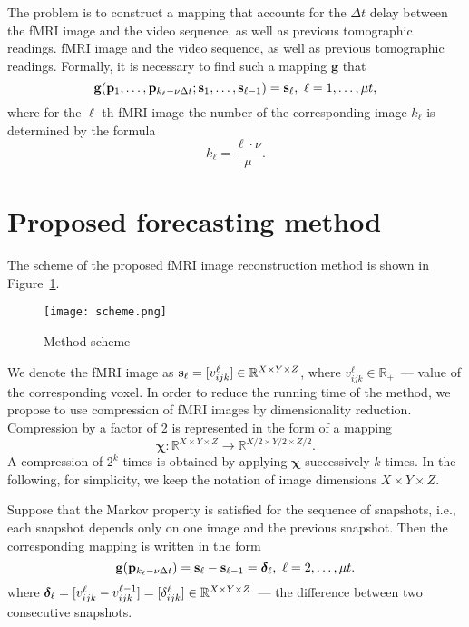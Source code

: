 \documentclass{article}
\begin{document}
The problem is to construct a mapping that accounts for the $\Delta t$ delay between the fMRI image and the video sequence, as well as previous tomographic readings.
fMRI image and the video sequence, as well as previous tomographic readings. Formally, it is necessary to
find such a mapping $\mathbf{g}$ that
\begin{equation}
	\label{eq3}
	\mathbf{g}(\mathbf{p}_1, \ldots, \mathbf{p}_{k_{\ell} - \nu \Delta t}; \mathbf{s}_1, \ldots, \mathbf{s}_{\ell-1}) = \mathbf{s}_{\ell},
	\ \ell = 1, \ldots, \mu t,
\end{equation}
where for the $\ell$-th fMRI image the number of the corresponding image $k_{\ell}$ is determined by the formula
\begin{equation}
	\label{eq4}
	k_{\ell} = \dfrac{\ell \cdot \nu}{\mu}.
\end{equation}

\section{Proposed forecasting method}

The scheme of the proposed fMRI image reconstruction method is shown in Figure~\ref{fig:scheme}. 

\begin{figure}[h!]
	\centering
	\texttt{[image: scheme.png]}
	\caption{Method scheme}
	\label{fig:scheme}
\end{figure}

We denote the fMRI image as $\mathbf{s}_{\ell} = [v^{\ell}_{ijk}] \in \mathbb{R}^{X \times Y \times Z}$,
where $v^{\ell}_{ijk} \in \mathbb{R}_+$~--- value of the corresponding voxel.
In order to reduce the running time of the method, we propose to use compression of fMRI images by dimensionality reduction.
Compression by a factor of 2 is represented in the form of a mapping
\[\bm{\chi}: \mathbb{R}^{X \times Y \times Z} \to \mathbb{R}^{X/2 \times Y/2 \times Z/2}.\]
A compression of $2^k$ times is obtained by applying $\bm{\chi}$ successively $k$ times. 
In the following, for simplicity, we keep the notation of image dimensions $X \times Y \times Z$.

Suppose that the Markov property is satisfied for the sequence of snapshots,
i.e., each snapshot depends only on one image and the previous snapshot.
Then the corresponding mapping is written in the form
\begin{equation}
	\label{eq5}
	\mathbf{g}(\mathbf{p}_{k_{\ell} - \nu \Delta t}) = \mathbf{s}_{\ell} - \mathbf{s}_{\ell-1} = \boldsymbol{\delta}_{\ell}, \ \ell = 2, \ldots, \mu t.
\end{equation}
where $\boldsymbol{\delta}_{\ell} = [v^{\ell}_{ijk} - v^{\ell-1}_{ijk}] = [\delta^{\ell}_{ijk}] \in \mathbb{R}^{X \times Y \times Z}$~--- the difference between two consecutive snapshots.
\end{document}
